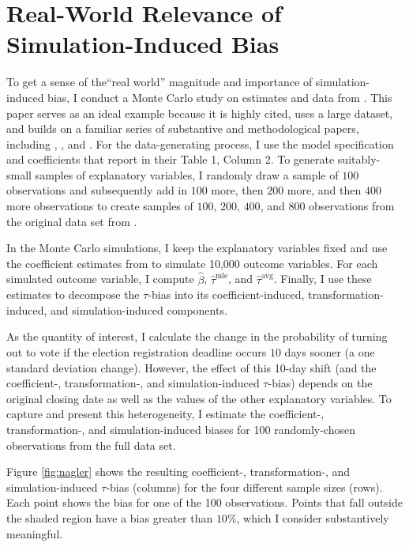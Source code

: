 \documentclass[12pt]{article}
\begin{document}
\newpage

\section{Real-World Relevance of Simulation-Induced Bias}\label{appendix:nagler}

\onehalfspace

To get a sense of the``real world'' magnitude and importance of simulation-induced bias, I conduct a Monte Carlo study on estimates and data from \cite{BerryDeMerittEsarey2010}. This paper serves as an ideal example because it is highly cited, uses a large dataset, and builds on a familiar series of substantive and methodological papers, including \cite{WolfingerRosenstone1980}, \cite{Nagler1991, Nagler1994}, and \cite{AltmanMcDonald2003}.
For the data-generating process, I use the model specification and coefficients that \cite{BerryDeMerittEsarey2010} report in their Table 1, Column 2. 
To generate suitably-small samples of explanatory variables, I randomly draw a sample of $100$ observations and subsequently add in $100$ more, then $200$ more, and then $400$ more observations to create samples of $100$, $200$, $400$, and $800$ observations from the original data set from \cite{BerryDeMerittEsarey2010}.

In the Monte Carlo simulations, I keep the explanatory variables fixed and use the coefficient estimates from \cite{BerryDeMerittEsarey2010} to simulate 10,000 outcome variables. For each simulated outcome variable, I compute $\hat{\beta}$, $\hat{\tau}^\text{mle}$, and $\hat{\tau}^\text{avg}$. Finally, I use these estimates to decompose the $\tau$-bias into its coefficient-induced, transformation-induced, and simulation-induced components.

As the quantity of interest, I calculate the change in the probability of turning out to vote if the election registration deadline occurs $10$ days sooner (a one standard deviation change). 
However, the effect of this 10-day shift (and the coefficient-, transformation-, and simulation-induced $\tau$-bias) depends on the original closing date as well as the values of the other explanatory variables. To capture and present this heterogeneity, I estimate the coefficient-, transformation-, and simulation-induced biases for 100 randomly-chosen observations from the full data set. 

Figure \ref{fig:nagler} shows the resulting coefficient-, transformation-, and simulation-induced $\tau$-bias (columns) for the four different sample sizes (rows). Each point shows the bias for one of the 100 observations. Points that fall outside the shaded region have a bias greater than $10\%$, which I consider substantively meaningful.
\end{document}
